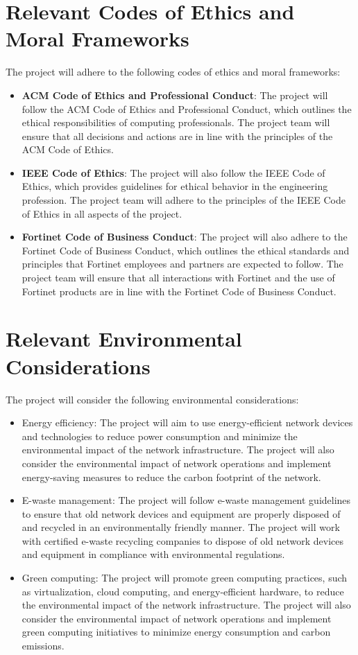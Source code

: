 \documentclass[12pt]{report}
\begin{document}
\section{Relevant Codes of Ethics and Moral Frameworks}
The project will adhere to the following codes of ethics and moral frameworks:
\begin{itemize}
    \item \textbf{ACM Code of Ethics and Professional Conduct}: The project will follow the ACM Code of Ethics and Professional Conduct, which outlines the ethical responsibilities of computing professionals. The project team will ensure that all decisions and actions are in line with the principles of the ACM Code of Ethics. \cite{ACM}
    \item \textbf{IEEE Code of Ethics}: The project will also follow the IEEE Code of Ethics, which provides guidelines for ethical behavior in the engineering profession. The project team will adhere to the principles of the IEEE Code of Ethics in all aspects of the project. \cite{IEEE}
    \item \textbf{Fortinet Code of Business Conduct}: The project will also adhere to the Fortinet Code of Business Conduct, which outlines the ethical standards and principles that Fortinet employees and partners are expected to follow. The project team will ensure that all interactions with Fortinet and the use of Fortinet products are in line with the Fortinet Code of Business Conduct. \cite{FortinetCOC}
\end{itemize}
\section{Relevant Environmental Considerations}
The project will consider the following environmental considerations:
\begin{itemize}
    \item Energy efficiency: The project will aim to use energy-efficient network devices and technologies to reduce power consumption and minimize the environmental impact of the network infrastructure. The project will also consider the environmental impact of network operations and implement energy-saving measures to reduce the carbon footprint of the network.
    \item E-waste management: The project will follow e-waste management guidelines to ensure that old network devices and equipment are properly disposed of and recycled in an environmentally friendly manner. The project will work with certified e-waste recycling companies to dispose of old network devices and equipment in compliance with environmental regulations.
    \item Green computing: The project will promote green computing practices, such as virtualization, cloud computing, and energy-efficient hardware, to reduce the environmental impact of the network infrastructure. The project will also consider the environmental impact of network operations and implement green computing initiatives to minimize energy consumption and carbon emissions.
\end{itemize}
\end{document}
